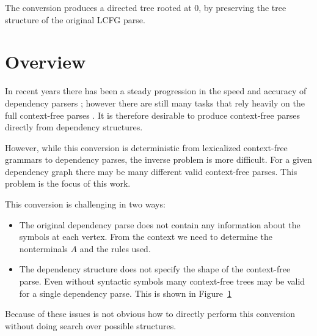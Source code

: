 \documentclass[11pt,letterpaper]{article}
\begin{document}


The conversion produces a directed tree rooted at $0$, by preserving the tree structure of the original LCFG parse.


\section{Overview}

In recent years there has been a steady progression in the speed and accuracy of dependency parsers \cite{}; however
there are still many tasks that rely heavily on the full context-free parses \cite{}. It is therefore desirable
to produce context-free parses directly from dependency structures.

However, while this conversion is deterministic from lexicalized context-free grammars
to dependency parses, the inverse problem is more difficult. For a given dependency
graph there may be many different valid context-free parses. This problem is the focus of this work.



This conversion is challenging in two ways:

\begin{itemize}
\item The original dependency parse does not contain any information about the symbols at each vertex. From the context we need to
determine the nonterminals $A$ and the rules used.

\item The dependency structure does not specify the shape of the context-free parse. Even without syntactic symbols many
context-free trees may be valid for a single dependency parse. This is shown in Figure~\ref{}
\end{itemize}


Because of these issues is not obvious how to directly perform this conversion without doing search over possible structures.
\end{document}
